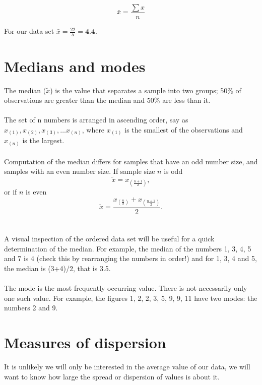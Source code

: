\documentclass[12pt]{article}
\begin{document}
\[ \bar{x} =  \frac{\sum x}{n}  \]

\noindent For our data set $\bar{x} = \frac{22}{5}  = \textbf{4.4}$.



\newpage
\section{Medians and modes}
The median ($\tilde{x}$) is the value that separates a sample into two groups; 50\% of observations are greater
than the median and 50\% are less than it.
\\ \\\noindent The set of n numbers is arranged in ascending order, say as $x_(1), x_(2), x_(3), \dots x_(n)$, where $x_(1)$ is the smallest of the observations and $x_(n)$ is the largest.
\\ \\\noindent Computation of the median differs for samples that have an odd number size, and samples with an even number size. If sample size $n$ is odd
\[ \tilde{x} =  x_{(\frac{n+1}{2})} ,\]
or if $n$ is even 
\[ \tilde{x} =  \frac{  x_{(\frac{n}{2})}  + x_{(\frac{n+1}{2})} }{2}. \]
\\ \\ \noindent A visual inspection of the ordered data set will be useful for a quick determination of the median.
For example, the median of the numbers 1, 3, 4, 5 and 7 is 4 (check this by
rearranging the numbers in order!) and for 1, 3, 4 and 5, the median is (3+4)/2, that is
3.5.
\\ \\ \noindent The mode is the most frequently occurring value. There is not necessarily only one
such value. For example, the figures 1, 2, 2, 3, 5, 9, 9, 11 have two modes: the
numbers 2 and 9.




\section{Measures of dispersion}
It is unlikely we will only be interested in the average value of our data, we will want
to know how large the spread or dispersion of values is about it. 
\end{document}
